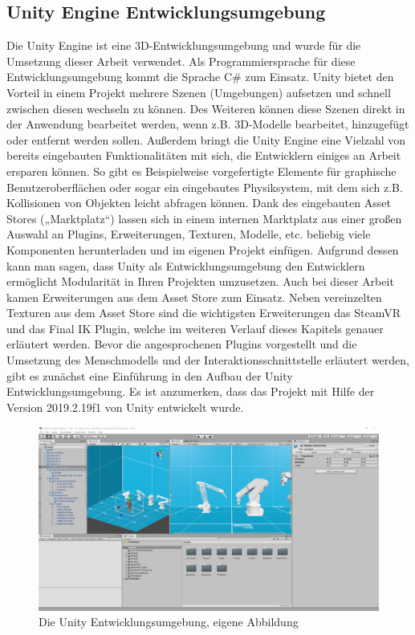 \subsection{Unity Engine Entwicklungsumgebung}\label{sec:UnitEngine}
Die Unity Engine ist eine 3D-Entwicklungsumgebung und wurde für die Umsetzung dieser Arbeit verwendet. Als Programmiersprache für diese Entwicklungsumgebung kommt die Sprache C\# zum Einsatz. Unity bietet den Vorteil in einem Projekt mehrere Szenen (Umgebungen) aufsetzen und schnell zwischen diesen wechseln zu können. Des Weiteren können diese Szenen direkt in der Anwendung bearbeitet werden, wenn z.B. 3D-Modelle bearbeitet, hinzugefügt oder entfernt werden sollen. Außerdem bringt die Unity Engine eine Vielzahl von bereits eingebauten Funktionalitäten mit sich, die Entwicklern einiges an Arbeit ersparen können. So gibt es Beispielweise vorgefertigte Elemente für graphische Benutzeroberflächen oder sogar ein eingebautes Physiksystem, mit dem sich z.B. Kollisionen von Objekten leicht abfragen können. Dank des eingebauten Asset Stores („Marktplatz“) lassen sich in einem internen Marktplatz aus einer großen Auswahl an Plugins, Erweiterungen, Texturen, Modelle, etc. beliebig viele Komponenten herunterladen und im eigenen Projekt einfügen. Aufgrund dessen kann man sagen, dass Unity als Entwicklungsumgebung den Entwicklern ermöglicht Modularität in Ihren Projekten umzusetzen.
Auch bei dieser Arbeit kamen Erweiterungen aus dem Asset Store zum Einsatz. Neben vereinzelten Texturen aus dem Asset Store sind die wichtigsten Erweiterungen das SteamVR und das Final IK Plugin, welche im weiteren Verlauf dieses Kapitels genauer erläutert werden.
\newline\newline
Bevor die angesprochenen Plugins vorgestellt und die Umsetzung des Menschmodells und der Interaktionsschnittstelle erläutert werden, gibt es zunächst eine Einführung in den Aufbau der Unity Entwicklungsumgebung. Es ist anzumerken, dass das Projekt mit Hilfe der Version 2019.2.19f1 von Unity entwickelt wurde.
\begin{figure}[h]
	\centering
	\includegraphics[width=1\linewidth]{Bilder/A47_UnityOverview}
	\caption{Die Unity Entwicklungsumgebung, eigene Abbildung}
	\label{fig:UnityOverview}
\end{figure}
